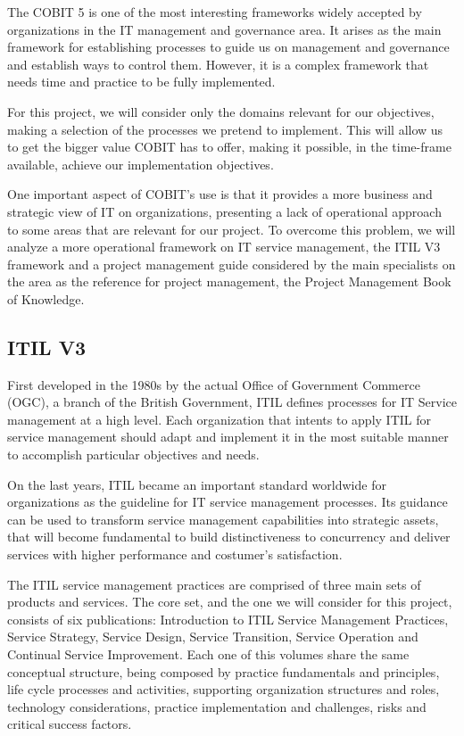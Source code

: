 The COBIT 5 is one of the most interesting frameworks widely accepted by organizations in the IT management and governance area. It arises as the main framework for establishing processes to guide us on management and governance and establish ways to control them. However, it is a complex framework that needs time and practice to be fully implemented.\par
For this project, we will consider only the domains relevant for our objectives, making a selection of the processes we pretend to implement. This will allow us to get the bigger value COBIT has to offer, making it possible, in the time-frame available, achieve our implementation objectives.\par
One important aspect of COBIT's use is that it provides a more business and strategic view of IT on organizations, presenting a lack of operational approach to some areas that are relevant for our project. To overcome this problem, we will analyze a more operational framework on IT service management, the ITIL V3 framework\cite{itilIntro,itilSS,itilST,itilSD,itilSO,itilCSI} and a project management guide considered by the main specialists on the area as the reference for project management, the Project Management Book of Knowledge\cite{pmbok5}.\par


\subsection{ITIL V3}

First developed in the 1980s by the actual Office of Government Commerce (OGC), a branch of the British Government, ITIL defines processes for IT Service management at a high level. Each organization that intents to apply ITIL for service management should adapt and implement it in the most suitable manner to accomplish  particular objectives and needs.\cite{hill2006combine}\par
On the last years, ITIL became an important standard worldwide for organizations as the guideline for IT service management processes. Its guidance can be used to transform service management capabilities into strategic assets, that will become fundamental to build distinctiveness to concurrency and deliver services with higher performance and costumer's satisfaction.\par
The ITIL service management practices are comprised of three main sets of products and services. The core set, and the one we will consider for this project, consists of six publications: Introduction to ITIL Service Management Practices, Service Strategy, Service Design, Service Transition, Service Operation and Continual Service Improvement. Each one of this volumes share the same conceptual structure, being composed by practice fundamentals and principles, life cycle processes and activities, supporting organization structures and roles, technology considerations, practice implementation and challenges, risks and critical success factors.\par

